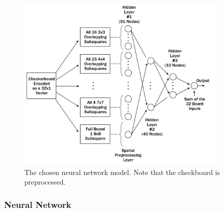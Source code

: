 \documentclass[12pt,a4paper]{article}
\begin{document}
    \begin{figure}[ht!]
        \centering
        \caption{The chosen neural network model. Note that the checkboard is preprocessed. \label{overflow}}
        \vspace{10pt}
        \includegraphics[width=100mm]{nnmodel.png}
        \vspace{-25pt}
    \end{figure}

    
\subsubsection{Neural Network}
\end{document}
